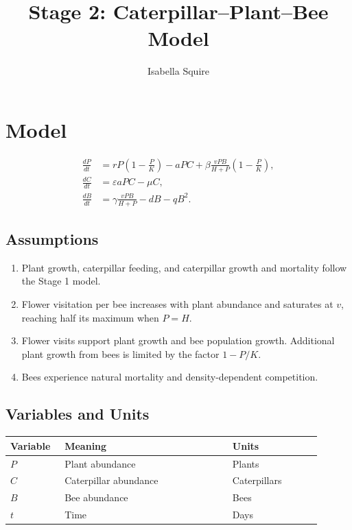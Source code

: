 \documentclass[11pt]{article}
\title{Stage 2: Caterpillar--Plant--Bee Model}
\author{Isabella Squire}
\date{}
\begin{document}
\maketitle

\section{Model}

\begin{equation}
    \begin{aligned}
        \frac{dP}{dt} &= rP\left(1-\frac{P}{K}\right)-aPC
        +\beta\frac{vPB}{H+P}\left(1-\frac{P}{K}\right), \\
        \frac{dC}{dt} &= \varepsilon aPC-\mu C, \\
        \frac{dB}{dt} &= \gamma\frac{vPB}{H+P}-dB-qB^2.
    \end{aligned}
\end{equation}

\subsection{Assumptions}
\begin{enumerate}
    \item Plant growth, caterpillar feeding, and caterpillar growth and
    mortality follow the Stage 1 model.
    \item Flower visitation per bee increases with plant abundance and
    saturates at $v$, reaching half its maximum when $P=H$.
    \item Flower visits support plant growth and bee population growth.
    Additional plant growth from bees is limited by the factor $1-P/K$.
    \item Bees experience natural mortality and density-dependent competition.
\end{enumerate}

\subsection{Variables and Units}
\begin{center}
    \begin{tabular}{@{}p{0.15\linewidth}p{0.49\linewidth}p{0.26\linewidth}@{}}
        \hline
        Variable & Meaning & Units \\
        \hline
        $P$ & Plant abundance & Plants \\
        $C$ & Caterpillar abundance & Caterpillars \\
        $B$ & Bee abundance & Bees \\
        $t$ & Time & Days \\
        \hline
    \end{tabular}
\end{center}
\end{document}
